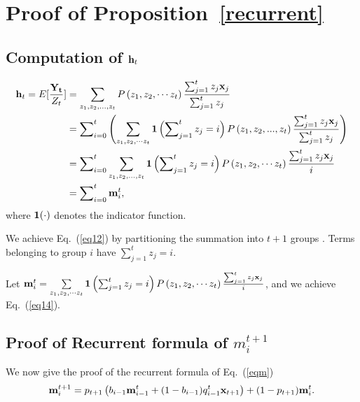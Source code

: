\documentclass{article} \usepackage{iclr2019_conference,times}
\begin{document}
\section{Proof of Proposition~\ref{recurrent}}\label{proof_recurrent}

\subsection{Computation of ${\bf h}_t$}

\begin{align}
{{\bf h}_t} = E[\frac{{{\bf{Y}_t}}}{{{Z_t}}}] & = \sum\limits_{{z_1},{z_2},...,{z_t}} {P\left( {{z_1},{z_2},\cdots{z_t}} \right)\frac{{\sum\nolimits_{j = 1}^t {{z_j}{{\bf x}_j}} }}{{\sum\nolimits_{j = 1}^t {{z_j}} }}}  \\
& =  \sum\nolimits_{i = 0}^t {\left( {\sum\limits_{{z_1},{z_2},\cdots {z_t}} {{\bf{1}}\left( {\sum\nolimits_{j = 1}^t {{z_j} = i} } \right)P\left( {{z_1},{z_2},...,{z_t}} \right)\frac{{\sum\nolimits_{j = 1}^t {{z_j}{{\bf x}_j}} }}{{\sum\nolimits_{j = 1}^t {{z_j}} }}} } \right)}  \label{eq12} \\
& = \sum\nolimits_{i = 0}^t {\sum\limits_{{z_1},{z_2},...,{z_t}} {{\bf{1}}\left( {\sum\nolimits_{j = 1}^t {{z_j} = i} } \right)P\left( {{z_1},{z_2},\cdots{z_t}} \right)\frac{{\sum\nolimits_{j = 1}^t {{z_j}{{\bf x}_j}} }}{i}} } \\
& = \sum\nolimits_{i = 0}^t {{\bf m}_i^t} \label{eq14},
\end{align}
where $\bf{1}(\cdot)$ denotes the indicator function.

We achieve Eq.~(\ref{eq12}) by partitioning the summation into $t+1$ groups . Terms belonging to group $i$ have ${\sum\nolimits_{j = 1}^t {{z_j}} } = i$.

Let ${\bf m}^t_i = {\sum\limits_{{z_1},{z_2},\cdots{z_t}} {{\bf{1}}\left( {\sum\nolimits_{j = 1}^t {{z_j} = i} } \right)P\left( {{z_1},{z_2},\cdots {z_t}} \right)\frac{{\sum\nolimits_{j = 1}^t {{z_j}{{\bf x}_j}} }}{i}} } $, and we achieve Eq.~(\ref{eq14}).


\subsection{Proof of Recurrent formula of $m^{t+1}_i$}
We now give the proof of the recurrent formula of Eq.~(\ref{eqm}) 
\begin{align}
\label{eqm}
{\bf m}_i^{t + 1} = {p_{t + 1}}\left( {{b_{i - 1}}{\bf m}_{i - 1}^t + (1 - {b_{i - 1}})q_{i - 1}^t{{\bf{x}}_{t + 1}}} \right) + (1 - {p_{t + 1}}){\bf m}_i^t.
\end{align}
\end{document}
